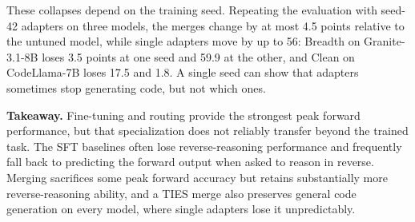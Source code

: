 These collapses depend on the training seed. Repeating the evaluation with
seed-42 adapters on three models, the merges change by at most 4.5 points
relative to the untuned model, while single adapters move by up to 56:
Breadth on Granite-3.1-8B loses 3.5 points at one seed and 59.9 at the
other, and Clean on CodeLlama-7B loses 17.5 and 1.8. A single seed can show
that adapters sometimes stop generating code, but not which ones.



\begin{takeaway}
\textbf{Takeaway.}
Fine-tuning and routing provide the strongest peak forward performance, but
that specialization does not reliably transfer beyond the trained task.
The SFT baselines often lose reverse-reasoning performance and frequently
fall back to predicting the forward output when asked to reason in reverse.
Merging sacrifices some peak forward accuracy but retains substantially more
reverse-reasoning ability, and a TIES merge also preserves general code
generation on every model, where single adapters lose it unpredictably.
\end{takeaway}

\FloatBarrier
